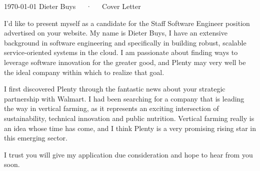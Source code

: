 \documentclass[11pt, a4paper]{awesome-cv}
\begin{document}
\makecvheader[R]

\makecvfooter
  {\today}
  {Dieter Buys~~~·~~~Cover Letter}
  {}

\makelettertitle

\begin{cvletter}

I'd like to present myself as a candidate for the Staff Software Engineer position advertised on your website. My name is Dieter Buys, I have an extensive background in software engineering and specifically in building robust, scalable service-oriented systems in the cloud. I am passionate about finding ways to leverage software innovation for the greater good, and Plenty may very well be the ideal company within which to realize that goal.

I first discovered Plenty through the fantastic news about your strategic partnership with Walmart. I had been searching for a company that is leading the way in vertical farming, as it represents an exciting intersection of sustainability, technical innovation and public nutrition. Vertical farming really is an idea whose time has come, and I think Plenty is a very promising rising star in this emerging sector.

I trust you will give my application due consideration and hope to hear from you soon.

\end{cvletter}


\makeletterclosing
\end{document}
